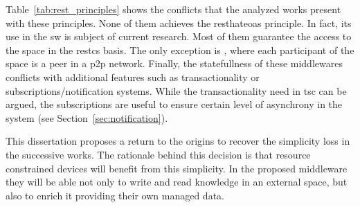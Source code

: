 Table~\ref{tab:rest_principles} shows the conflicts that the analyzed works present with these principles.
None of them achieves the \ac{resthateoas} principle.
In fact, its use in the \ac{sw} is subject of current research.
Most of them guarantee the access to the space in the \ac{restcs} basis.
The only exception is \midtscpp{}, where each participant of the space is a peer in a \ac{p2p} network.
Finally, the statefullness of these middlewares conflicts with additional features such as transactionality or subscriptions/notification systems.
While the transactionality need in \ac{tsc} can be argued,
the subscriptions are useful to ensure certain level of asynchrony in the system (see Section~\ref{sec:notification}).





This dissertation proposes a return to the origins to recover the simplicity loss in the successive works.
The rationale behind this decision is that resource constrained devices will benefit from this simplicity.
In the proposed middleware they will be able not only to write and read knowledge in an external space, but also to enrich it providing their own managed data.
